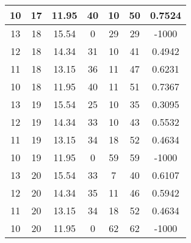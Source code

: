 \documentclass[letterpaper, 12pt]{article}
\begin{document}
\begin{longtable}{|c|c|c|c|c|c|c|}
10 & 17 & 11.95 & 40 & 10 & 50 & 0.7524 \\
\hline
13 & 18 & 15.54 & 0 & 29 & 29 & -1000 \\
\hline
12 & 18 & 14.34 & 31 & 10 & 41 & 0.4942 \\
\hline
11 & 18 & 13.15 & 36 & 11 & 47 & 0.6231 \\
\hline
10 & 18 & 11.95 & 40 & 11 & 51 & 0.7367 \\
\hline
13 & 19 & 15.54 & 25 & 10 & 35 & 0.3095 \\
\hline
12 & 19 & 14.34 & 33 & 10 & 43 & 0.5532 \\
\hline
11 & 19 & 13.15 & 34 & 18 & 52 & 0.4634 \\
\hline
10 & 19 & 11.95 & 0 & 59 & 59 & -1000 \\
\hline
13 & 20 & 15.54 & 33 & 7 & 40 & 0.6107 \\
\hline
12 & 20 & 14.34 & 35 & 11 & 46 & 0.5942 \\
\hline
11 & 20 & 13.15 & 34 & 18 & 52 & 0.4634 \\
\hline
10 & 20 & 11.95 & 0 & 62 & 62 & -1000 \\
\hline
\end{longtable}
\end{document}
